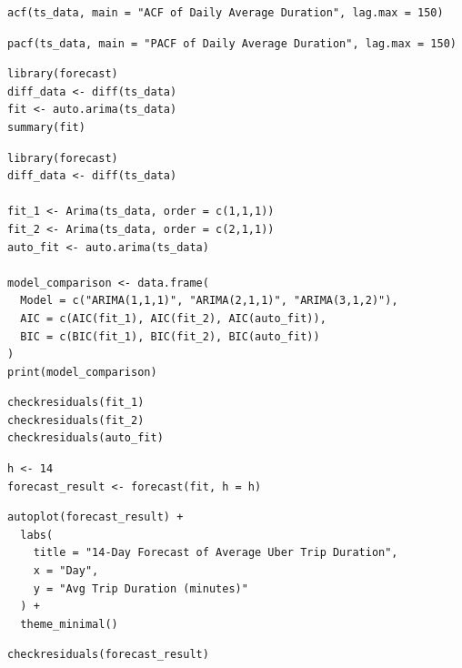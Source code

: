 \documentclass{article}
\begin{document}
\begin{lstlisting}[style=rstyle, caption={ ACF Plot}, label={lst:r_acf}]
acf(ts_data, main = "ACF of Daily Average Duration", lag.max = 150)
\end{lstlisting}

\begin{lstlisting}[style=rstyle, caption={ PACF Plot}, label={lst:r_pacf}]
pacf(ts_data, main = "PACF of Daily Average Duration", lag.max = 150)
\end{lstlisting}

\begin{lstlisting}[style=rstyle, caption={ ARIMA Model}, label={lst:r_arima}]
library(forecast)
diff_data <- diff(ts_data)
fit <- auto.arima(ts_data)
summary(fit)
\end{lstlisting}

\begin{lstlisting}[style=rstyle, caption={ Model Selection and Diagnostics}, label={lst:r_arima_model}]
library(forecast)
diff_data <- diff(ts_data)

fit_1 <- Arima(ts_data, order = c(1,1,1))
fit_2 <- Arima(ts_data, order = c(2,1,1))
auto_fit <- auto.arima(ts_data)

model_comparison <- data.frame(
  Model = c("ARIMA(1,1,1)", "ARIMA(2,1,1)", "ARIMA(3,1,2)"),
  AIC = c(AIC(fit_1), AIC(fit_2), AIC(auto_fit)),
  BIC = c(BIC(fit_1), BIC(fit_2), BIC(auto_fit))
)
print(model_comparison)
\end{lstlisting}

\begin{lstlisting}[style=rstyle, caption={ Model Selection and Diagnostics}, label={lst:r_arima_resid}]
checkresiduals(fit_1)
checkresiduals(fit_2)
checkresiduals(auto_fit)
\end{lstlisting}

\begin{lstlisting}[style=rstyle, caption={ 14-day Forecast}, label={lst:r_forecast}]
h <- 14
forecast_result <- forecast(fit, h = h)
\end{lstlisting}

\begin{lstlisting}[style=rstyle, caption={ Plot of 14-day Forecast}, label={lst:r_forecast_plot}]
autoplot(forecast_result) +
  labs(
    title = "14-Day Forecast of Average Uber Trip Duration",
    x = "Day",
    y = "Avg Trip Duration (minutes)"
  ) +
  theme_minimal()
\end{lstlisting}

\begin{lstlisting}[style=rstyle, caption={ 14-day Forecast Residuals}, label={lst:r_forecast_resid}]
checkresiduals(forecast_result)
\end{lstlisting}
\end{document}
